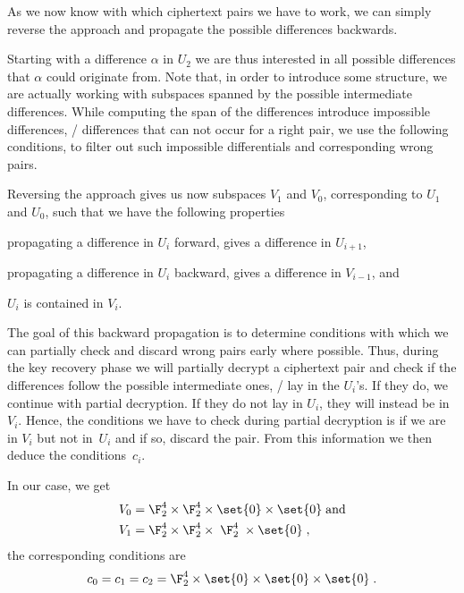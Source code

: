 As we now know with which ciphertext pairs we have to work, we can simply reverse the approach and propagate the possible differences backwards.

Starting with a difference $\alpha$ in $U_2$ we are thus interested in all possible differences that $\alpha$ could originate from.
Note that, in order to introduce some structure, we are actually working with subspaces spanned by the possible intermediate differences.
While computing the span of the differences introduce impossible differences, \ie/ differences that can not occur for a right pair, we use the following conditions, to filter out such impossible differentials and corresponding wrong pairs.

Reversing the approach gives us now subspaces $V_1$ and $V_0$, corresponding to $U_1$ and $U_0$, such that we have the following properties
\begin{inparaenum}
    \item propagating a difference in $U_i$ forward, gives a difference in $U_{i+1}$,
    \item propagating a difference in $U_i$ backward, gives a difference in $V_{i-1}$, and
    \item $U_i$ is contained in $V_i$.
\end{inparaenum}
The goal of this backward propagation is to determine conditions with which we can partially check and discard wrong pairs early where possible.
Thus, during the key recovery phase we will partially decrypt a ciphertext pair and check if the differences follow the possible intermediate ones, \ie/ lay in the $U_i$'s.
If they do, we continue with partial decryption.
If they do not lay in $U_i$, they will instead be in $V_i$.
Hence, the conditions we have to check during partial decryption is if we are in $V_i$ but not in~$U_i$ and if so, discard the pair.
From this information we then deduce the conditions~$c_i$.

In our case, we get
\begin{align*}
    V_0 &= \F_2^4 \times \F_2^4 \times \set{0} \times \set{0}\;\text{and}\\
    V_1 &= \F_2^4 \times \F_2^4 \times \;\F_2^4\; \times \set{0}\;,
\end{align*}
the corresponding conditions are
\begin{equation*}
    c_0 = c_1 = c_2 = \F_2^4 \times \set{0} \times \set{0} \times \set{0}\;.
\end{equation*}

